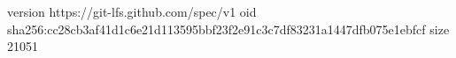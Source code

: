 version https://git-lfs.github.com/spec/v1
oid sha256:cc28cb3af41d1c6e21d113595bbf23f2e91c3c7df83231a1447dfb075e1ebfcf
size 21051
